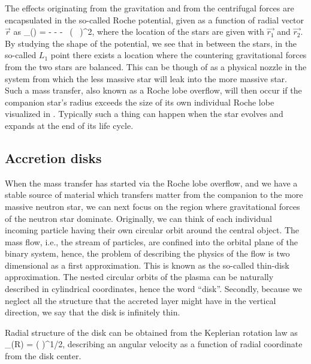 The effects originating from the gravitation and from the centrifugal forces are encapsulated in the so-called Roche potential, given as a function of radial vector $\vec{r}$ as\cite[see, e.g.,][]{PRP02, LL15}
\be
\Phi_{}() = - - -  ( \vec{ \omega } \times {} )^2,
\ee
where the location of the stars are given with $\vec{r_1}$ and $\vec{r_2}$.
By studying the shape of the potential, we see that in between the stars, in the so-called $L_1$ point there exists a location where the countering gravitational forces from the two stars are balanced.
This can be though of as a physical nozzle in the system from which the less massive star will leak into the more massive star.
Such a mass transfer, also known as a Roche lobe overflow, will then occur if the companion star's radius exceeds the size of its own individual Roche lobe visualized in .
Typically such a thing can happen when the star evolves and expands at the end of its life cycle. 


\subsection{Accretion disks}

When the mass transfer has started via the Roche lobe overflow, and we have a stable source of material which transfers matter from the companion to the more massive neutron star, we can next focus on the region where gravitational forces of the neutron star dominate.
Originally, we can think of each individual incoming particle having their own circular orbit around the central object.
The mass flow, i.e., the stream of particles, are confined into the orbital plane of the binary system, hence, the problem of describing the physics of the flow is two dimensional as a first approximation.
This is known as the so-called thin-disk approximation.
The nested circular orbits of the plasma can be naturally described in cylindrical coordinates, hence the word ``disk''.
Secondly, because we neglect all the structure that the accreted layer might have in the vertical direction, we say that the disk is infinitely thin.

Radial structure of the disk can be obtained from the Keplerian rotation law as
\be
\Omega_{}(R) = \left(  \right)^{1/2},
\ee
describing an angular velocity as a function of radial coordinate from the disk center.

